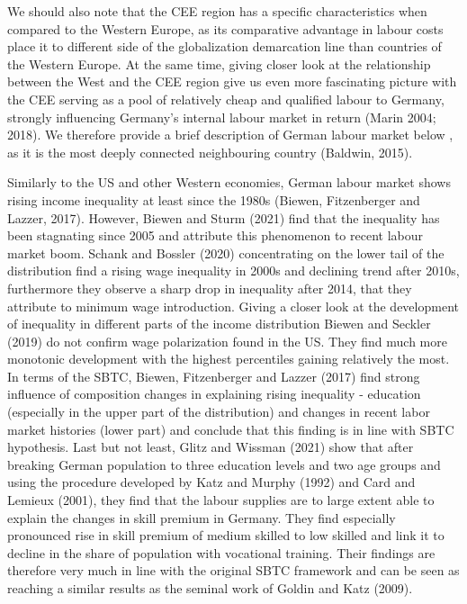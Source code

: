 \documentclass{article}
\begin{document}
We should also note that the CEE region has a specific characteristics when compared to the Western Europe, as its comparative advantage in labour costs place it to different side of the globalization demarcation line than countries of the Western Europe. At the same time, giving closer look at the relationship between the West and the CEE region give us even more fascinating picture with the CEE serving as a pool of relatively cheap and qualified labour to Germany, strongly influencing Germany's internal labour market in return (Marin 2004; 2018). We therefore provide a brief description of German labour market below , as it is the most deeply connected neighbouring country (Baldwin, 2015).

Similarly to the US and other Western economies, German labour market shows rising income inequality at least since the 1980s (Biewen, Fitzenberger and Lazzer, 2017). However, Biewen and Sturm (2021) find that the inequality has been stagnating since 2005 and attribute this phenomenon to recent labour market boom. Schank and Bossler (2020) concentrating on the lower tail of the distribution find a rising wage inequality in 2000s and declining trend after 2010s, furthermore they observe a sharp drop in inequality after 2014, that they attribute to minimum wage introduction.
Giving a closer look at the development of inequality in different parts of the income distribution Biewen and Seckler (2019) do not confirm wage polarization found in the US. They find much more monotonic development with the highest percentiles gaining relatively the most.
In terms of the SBTC, Biewen, Fitzenberger and Lazzer (2017) find strong influence of composition changes in explaining rising inequality - education (especially in the upper part of the distribution) and changes in recent labor market histories (lower part) and conclude that this finding is in line with SBTC hypothesis.
Last but not least, Glitz and Wissman (2021) show that after breaking German population to three education levels and two age groups and using the procedure developed by Katz and Murphy (1992) and Card and Lemieux (2001), they find that the labour supplies are to large extent able to explain the changes in skill premium in Germany. They find especially pronounced rise in skill premium of medium skilled to low skilled and link it to decline in the share of population with vocational training. Their findings are therefore very much in line with the original SBTC framework and can be seen as reaching a similar results as the seminal work of Goldin and Katz (2009).
\end{document}
